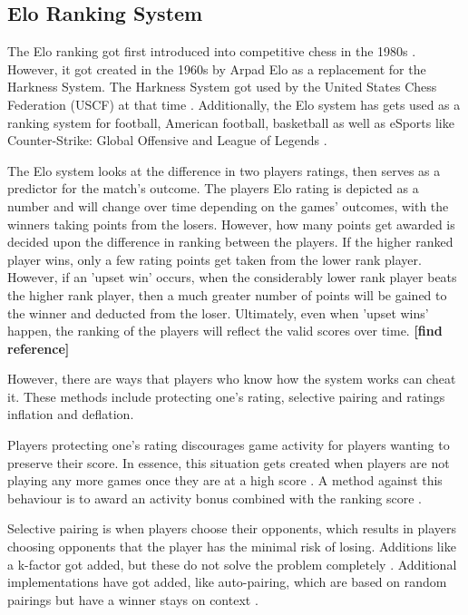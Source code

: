 	\subsection{Elo Ranking System}
	The Elo ranking got first introduced into competitive chess in the 1980s \cite{weng2011bayesian}. However, it got created in the 1960s by Arpad Elo as a replacement for the Harkness System. The Harkness System got used by the United States Chess Federation (USCF) at that time \cite{elo1978rating}. Additionally, the Elo system has gets used as a ranking system for football, American football, basketball as well as eSports like Counter-Strike: Global Offensive and League of Legends \cite{silver2015we, pradhan2020power}.
	
	The Elo system looks at the difference in two players ratings, then serves as a predictor for the match's outcome. The players Elo rating is depicted as a number and will change over time depending on the games' outcomes, with the winners taking points from the losers. However, how many points get awarded is decided upon the difference in ranking between the players. If the higher ranked player wins, only a few rating points get taken from the lower rank player. However, if an 'upset win' occurs, when the considerably lower rank player beats the higher rank player, then a much greater number of points will be gained to the winner and deducted from the loser. Ultimately, even when 'upset wins' happen, the ranking of the players will reflect the valid scores over time. \textbf{[find reference]}
	
	However, there are ways that players who know how the system works can cheat it. These methods include protecting one's rating, selective pairing and ratings inflation and deflation.
	
	Players protecting one's rating discourages game activity for players wanting to preserve their score. In essence, this situation gets created when players are not playing any more games once they are at a high score \cite{friedman2013playing}.  A method against this behaviour is to award an activity bonus combined with the ranking score \cite{edelkamp2021elo}.
	
	Selective pairing is when players choose their opponents, which results in players choosing opponents that the player has the minimal risk of losing. Additions like a k-factor got added, but these do not solve the problem completely \cite{edelkamp2021elo}. Additional implementations have got added, like auto-pairing, which are based on random pairings but have a winner stays on context \cite{edelkamp2021elo}.
	
